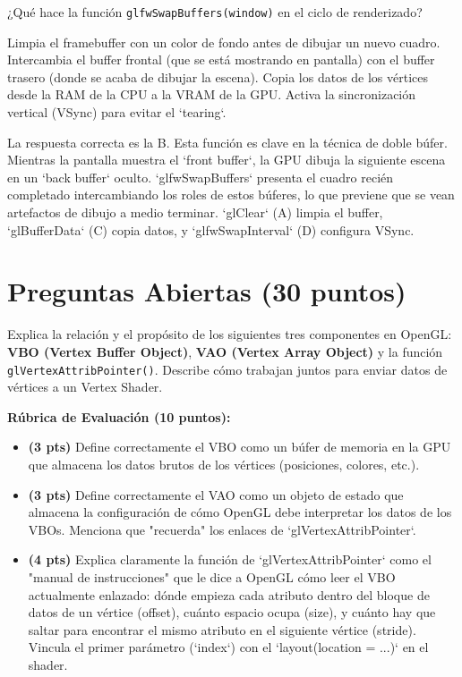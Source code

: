 \documentclass[addpoints,10pt]{exam}
\begin{document}
\begin{questions}
	\question[4]
	¿Qué hace la función \texttt{glfwSwapBuffers(window)} en el ciclo de renderizado?
	\begin{oneparchoices}
		\choice Limpia el framebuffer con un color de fondo antes de dibujar un nuevo cuadro.
		\choice Intercambia el buffer frontal (que se está mostrando en pantalla) con el buffer trasero (donde se acaba de dibujar la escena).
		\choice Copia los datos de los vértices desde la RAM de la CPU a la VRAM de la GPU.
		\choice Activa la sincronización vertical (VSync) para evitar el `tearing`.
	\end{oneparchoices}
	\begin{solution}
	La respuesta correcta es la B. Esta función es clave en la técnica de doble búfer. Mientras la pantalla muestra el `front buffer`, la GPU dibuja la siguiente escena en un `back buffer` oculto. `glfwSwapBuffers` presenta el cuadro recién completado intercambiando los roles de estos búferes, lo que previene que se vean artefactos de dibujo a medio terminar. `glClear` (A) limpia el buffer, `glBufferData` (C) copia datos, y `glfwSwapInterval` (D) configura VSync.
	\end{solution}
	
	\part{Preguntas Abiertas (30 puntos)}
	
	\question[10]
	Explica la relación y el propósito de los siguientes tres componentes en OpenGL: \textbf{VBO (Vertex Buffer Object)}, \textbf{VAO (Vertex Array Object)} y la función \texttt{glVertexAttribPointer()}. Describe cómo trabajan juntos para enviar datos de vértices a un Vertex Shader.
	
	\begin{solution}[\stretch{2in}]
	\textbf{Rúbrica de Evaluación (10 puntos):}
	\begin{itemize}
		\item \textbf{(3 pts)} Define correctamente el VBO como un búfer de memoria en la GPU que almacena los datos brutos de los vértices (posiciones, colores, etc.).
		\item \textbf{(3 pts)} Define correctamente el VAO como un objeto de estado que almacena la configuración de cómo OpenGL debe interpretar los datos de los VBOs. Menciona que "recuerda" los enlaces de `glVertexAttribPointer`.
		\item \textbf{(4 pts)} Explica claramente la función de `glVertexAttribPointer` como el "manual de instrucciones" que le dice a OpenGL cómo leer el VBO actualmente enlazado: dónde empieza cada atributo dentro del bloque de datos de un vértice (offset), cuánto espacio ocupa (size), y cuánto hay que saltar para encontrar el mismo atributo en el siguiente vértice (stride). Vincula el primer parámetro (`index`) con el `layout(location = ...)` en el shader.
	\end{itemize}
	\end{solution}


\end{questions}
\end{document}
